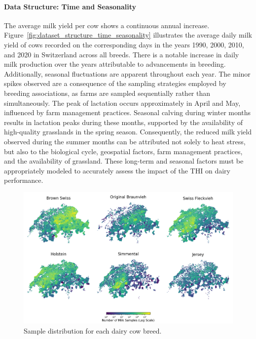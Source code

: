 \paragraph{Data Structure: Time and Seasonality}
The average milk yield per cow shows a continuous annual increase. Figure~\ref{fig:dataset_structure_time_seasonality} illustrates the average daily milk yield of cows recorded on the corresponding days in the years 1990, 2000, 2010, and 2020 in Switzerland across all breeds. There is a notable increase in daily milk production over the years attributable to advancements in breeding. Additionally, seasonal fluctuations are apparent throughout each year. The minor spikes observed are a consequence of the sampling strategies employed by breeding associations, as farms are sampled sequentially rather than simultaneously. The peak of lactation occurs approximately in April and May, influenced by farm management practices. Seasonal calving during winter months results in lactation peaks during these months, supported by the availability of high-quality grasslands in the spring season. Consequently, the reduced milk yield observed during the summer months can be attributed not solely to heat stress, but also to the biological cycle, geospatial factors, farm management practices, and the availability of grassland. These long-term and seasonal factors must be appropriately modeled to accurately assess the impact of the THI on dairy performance.


\begin{figure}[ht]
    \centering
    \includegraphics[width=\textwidth]{thesis/figures/dataset/sample_distribution.png}
    \caption{Sample distribution for each dairy cow breed.}
    \label{fig:dataset_sample_distribution}
\end{figure}

